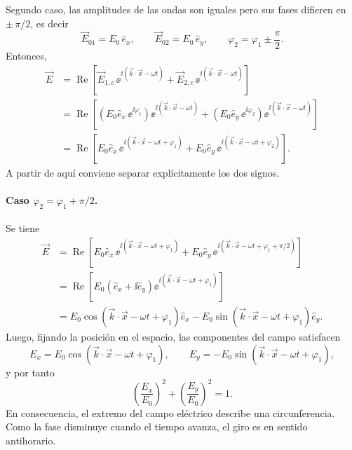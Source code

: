 \documentclass[../main.tex]{subfiles}
\begin{document}
Segundo caso, las amplitudes de las ondas son iguales pero sus fases difieren en $\pm\,\pi/2$, es decir
\begin{equation*}
    \vec E_{01}=E_0\,\hat e_x,
    \qquad
    \vec E_{02}=E_0\,\hat e_y,
    \qquad
    \varphi_2=\varphi_1\pm\frac{\pi}{2}.
\end{equation*}
Entonces,
\begin{align*}
    \vec E &= \operatorname{Re}\left[\vec E_{1,c}\,\ee^{\ii\left(\vec k\cdot\vec x-\omega t\right)}+\vec E_{2,c}\,\ee^{\ii\left(\vec k\cdot\vec x-\omega t\right)}\right] \\
    &= \operatorname{Re}\left[\left(E_0\hat e_x\,\ee^{\ii\varphi_1}\right)\ee^{\ii\left(\vec k\cdot\vec x-\omega t\right)}+\left(E_0\hat e_y\,\ee^{\ii\varphi_2}\right)\ee^{\ii\left(\vec k\cdot\vec x-\omega t\right)}\right] \\
    &= \operatorname{Re}\left[E_0\hat e_x\,\ee^{\ii\left(\vec k\cdot\vec x-\omega t+\varphi_1\right)}+E_0\hat e_y\,\ee^{\ii\left(\vec k\cdot\vec x-\omega t+\varphi_2\right)}\right].
\end{align*}
A partir de aquí conviene separar explícitamente los dos signos.

\paragraph{Caso $\varphi_2=\varphi_1+\pi/2$.}
Se tiene
\begin{align*}
    \vec E
    &= \operatorname{Re}\left[E_0\hat e_x\,\ee^{\ii\left(\vec k\cdot\vec x-\omega t+\varphi_1\right)}+E_0\hat e_y\,\ee^{\ii\left(\vec k\cdot\vec x-\omega t+\varphi_1+\pi/2\right)}\right] \\
    &= \operatorname{Re}\left[E_0\left(\hat e_x+\ii\hat e_y\right)\ee^{\ii\left(\vec k\cdot\vec x-\omega t+\varphi_1\right)}\right] \\
    &= E_0\cos\left(\vec k\cdot\vec x-\omega t+\varphi_1\right)\hat e_x-E_0\sin\left(\vec k\cdot\vec x-\omega t+\varphi_1\right)\hat e_y.
\end{align*}
Luego, fijando la posición en el espacio, las componentes del campo satisfacen
\begin{equation*}
    E_x=E_0\cos\left(\vec k\cdot\vec x-\omega t+\varphi_1\right),
    \qquad
    E_y=-E_0\sin\left(\vec k\cdot\vec x-\omega t+\varphi_1\right),
\end{equation*}
y por tanto
\begin{equation*}
    \left(\frac{E_x}{E_0}\right)^2+\left(\frac{E_y}{E_0}\right)^2=1.
\end{equation*}
En consecuencia, el extremo del campo eléctrico describe una circunferencia. Como la fase disminuye cuando el tiempo avanza, el giro es en sentido antihorario.
\end{document}
